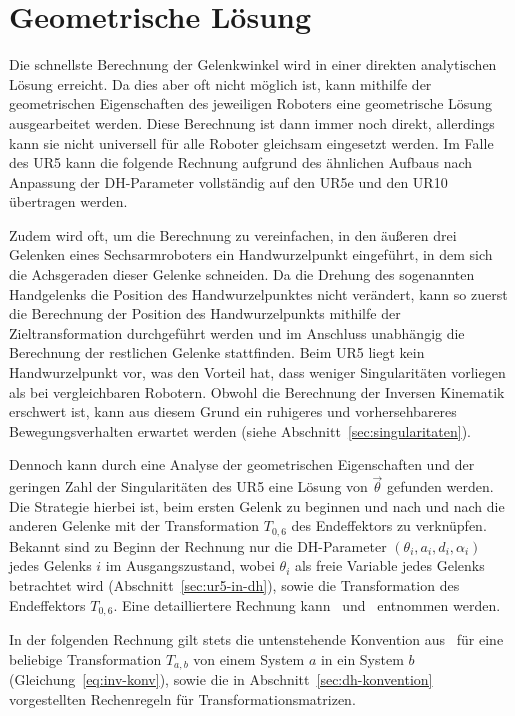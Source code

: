 \section{Geometrische Lösung}\label{sec:geometrische-losung}
Die schnellste Berechnung der Gelenkwinkel wird in einer direkten analytischen Lösung erreicht.
Da dies aber oft nicht möglich ist, kann mithilfe der geometrischen Eigenschaften des jeweiligen Roboters eine geometrische Lösung ausgearbeitet werden.
Diese Berechnung ist dann immer noch direkt, allerdings kann sie nicht universell für alle Roboter gleichsam eingesetzt werden.
Im Falle des UR5 kann die folgende Rechnung aufgrund des ähnlichen Aufbaus nach Anpassung der DH-Parameter vollständig auf den UR5e und den UR10 übertragen werden.

Zudem wird oft, um die Berechnung zu vereinfachen, in den äußeren drei Gelenken eines Sechsarmroboters ein Handwurzelpunkt eingeführt, in dem sich die Achsgeraden dieser Gelenke schneiden.
Da die Drehung des sogenannten Handgelenks die Position des Handwurzelpunktes nicht verändert, kann so zuerst die Berechnung der Position des Handwurzelpunkts mithilfe der Zieltransformation durchgeführt werden und im Anschluss unabhängig die Berechnung der restlichen Gelenke stattfinden.
Beim UR5 liegt kein Handwurzelpunkt vor, was den Vorteil hat, dass weniger Singularitäten vorliegen als bei vergleichbaren Robotern.
Obwohl die Berechnung der Inversen Kinematik erschwert ist, kann aus diesem Grund ein ruhigeres und vorhersehbareres Bewegungsverhalten erwartet werden (siehe Abschnitt~\ref{sec:singularitaten}).

Dennoch kann durch eine Analyse der geometrischen Eigenschaften und der geringen Zahl der Singularitäten des UR5 eine Lösung von $\overrightarrow{\theta}$ gefunden werden.
Die Strategie hierbei ist, beim ersten Gelenk zu beginnen und nach und nach die anderen Gelenke mit der Transformation $T_{0,6}$ des Endeffektors zu verknüpfen.
Bekannt sind zu Beginn der Rechnung nur die DH-Parameter $(\theta_i, a_i, d_i, \alpha_i)$ jedes Gelenks $i$ im Ausgangszustand, wobei $\theta_i$ als freie Variable jedes Gelenks betrachtet wird (Abschnitt~\ref{sec:ur5-in-dh}), sowie die Transformation des Endeffektors $T_{0,6}$.
Eine detailliertere Rechnung kann~\cite{rasmusandersenKinematicsUR52018} und~\cite{hawkinsAnalyticInverseKinematics2013} entnommen werden.

In der folgenden Rechnung gilt stets die untenstehende Konvention aus~\cite[82]{craigIntroductionRoboticsMechanics2009} für eine beliebige Transformation $T_{a,b}$ von einem System $a$ in ein System $b$ (Gleichung~\ref{eq:inv-konv}), sowie die in Abschnitt~\ref{sec:dh-konvention} vorgestellten Rechenregeln für Transformationsmatrizen.

